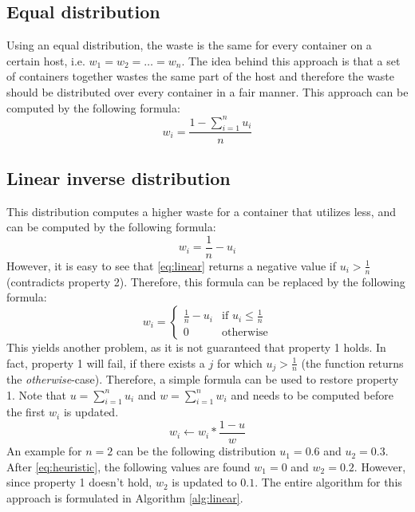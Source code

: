 \subsection{Equal distribution} \label{sec:equal}
Using an equal distribution, the waste is the same for every container on a certain host, i.e. $w_1 = w_2 = \dots = w_n$. The idea behind this approach is that a set of containers together wastes the same part of the host and therefore the waste should be distributed over every container in a fair manner. This approach can be computed by the following formula:
\begin{equation}
w_i = \frac{1 - \sum_{i=1}^n u_i}{n}
\end{equation}

\subsection{Linear inverse distribution} \label{sec:linear}
This distribution computes a higher waste for a container that utilizes less, and can be computed by the following formula:
\begin{equation} \label{eq:linear}
w_i = \frac{1}{n} - u_i
\end{equation}
However, it is easy to see that \autoref{eq:linear} returns a negative value if $u_i > \frac{1}{n}$ (contradicts property 2). Therefore, this formula can be replaced by the following formula:
\begin{equation}\label{eq:heuristic}
w_i = \begin{cases}
\frac{1}{n} - u_i & \text{if } u_i \leq \frac{1}{n}\\
0                 & \text{otherwise}
\end{cases}
\end{equation}
This yields another problem, as it is not guaranteed that property 1 holds. In fact, property 1 will fail, if there exists a $j$ for which $u_j > \frac{1}{n}$ (the function returns the \textit{otherwise}-case). Therefore, a simple formula can be used to restore property 1. Note that $u = \sum_{i=1}^n u_i$ and $w = \sum_{i=1}^n w_i$ and needs to be computed before the first $w_i$ is updated.
\begin{equation} \label{eq:update}
w_i \leftarrow w_i * \frac{1-u}{w}
\end{equation}
An example for $n = 2$ can be the following distribution $u_1 = 0.6$ and $u_2 = 0.3$. After \autoref{eq:heuristic}, the following values are found $w_1 = 0$ and $w_2 = 0.2$. However, since property 1 doesn't hold, $w_2$ is updated to $0.1$. The entire algorithm for this approach is formulated in Algorithm \ref{alg:linear}.

